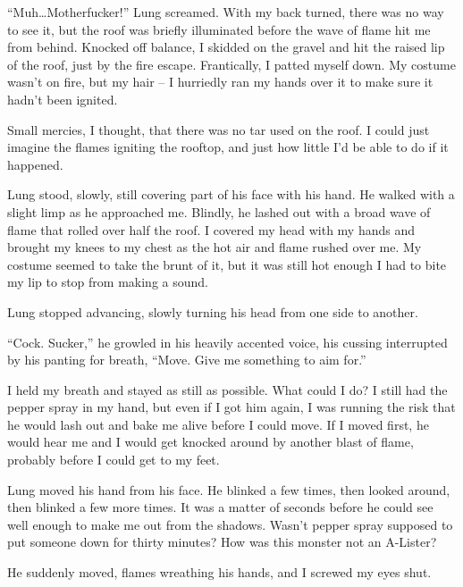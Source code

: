 ``Muh\ldots Motherfucker!''  Lung screamed.  With my back turned, there was no way to see it, but the roof was briefly illuminated before the wave of flame hit me from behind.  Knocked off balance, I skidded on the gravel and hit the raised lip of the roof, just by the fire escape.  Frantically, I patted myself down.  My costume wasn't on fire, but my hair – I hurriedly ran my hands over it to make sure it hadn't been ignited.



Small mercies, I thought, that there was no tar used on the roof.  I could just imagine the flames igniting the rooftop, and just how little I'd be able to do if it happened.



Lung stood, slowly, still covering part of his face with his hand.  He walked with a slight limp as he approached me.  Blindly, he lashed out with a broad wave of flame that rolled over half the roof.  I covered my head with my hands and brought my knees to my chest as the hot air and flame rushed over me.  My costume seemed to take the brunt of it, but it was still hot enough I had to bite my lip to stop from making a sound.



Lung stopped advancing, slowly turning his head from one side to another.



``Cock.  Sucker,'' he growled in his heavily accented voice, his cussing interrupted by his panting for breath, ``Move.  Give me something to aim for.''



I held my breath and stayed as still as possible.  What could I do?  I still had the pepper spray in my hand, but even if I got him again, I was running the risk that he would lash out and bake me alive before I could move.  If I moved first, he would hear me and I would get knocked around by another blast of flame, probably before I could get to my feet.



Lung moved his hand from his face.  He blinked a few times, then looked around, then blinked a few more times.  It was a matter of seconds before he could see well enough to make me out from the shadows.  Wasn't pepper spray supposed to put someone down for thirty minutes?  How was this monster not an A-Lister?



He suddenly moved, flames wreathing his hands, and I screwed my eyes shut.



